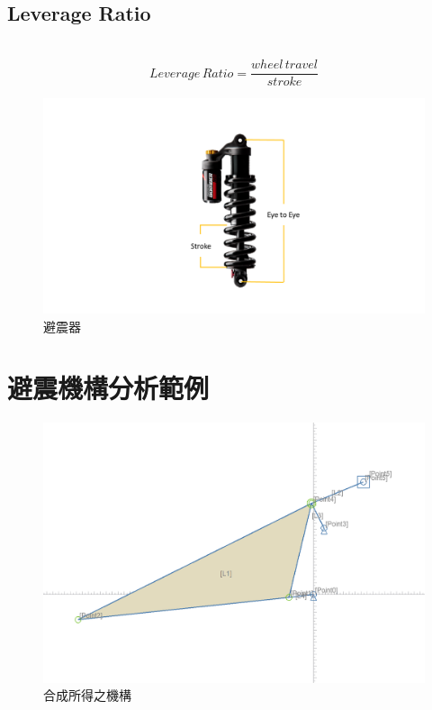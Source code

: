\documentclass[14pt,a4paper]{report}  %
\newcommand{\fourteen}{\fontsize{14pt}{\baselineskip}\selectfont}%
\begin{document}
       
       \hspace*{\fill} \\
       \subsection{Leverage Ratio}
       \fourteen {Leverage ratio是避震器壓縮量和後輪行程的比值，當較大的槓桿比率會對避震器產生較大的衝擊，而在騎乘時對於地形變化的感受度較不敏感，相反地較小的槓桿比率對於地形的敏感度較高。其計算方式如下所示。}
       \hspace*{\fill} \\
       \begin{equation}
       Leverage\, Ratio = \frac{wheel\,travel}{stroke}
       \end{equation}

       
       \begin{figure}[hbt!]
        \centering
        \includegraphics[scale=0.4]{stroke.png}
        \caption{避震器}
        \label{fig_stroke:scale}
    	\end{figure}
       
       
       \section{避震機構分析範例}
       \fourteen {此小節會將4.1節所得到的結果並配合4.2節所介紹的評比標準進行討論以檢驗是否得到最佳的尺寸。}
		\begin{figure}[hbt!]
        \centering
        \includegraphics[scale=0.4]{Firebird_mechanism.png}
        \caption{合成所得之機構}
        \label{fig_Firebird_mechanism:scale}
    	\end{figure}
		
\end{document}
